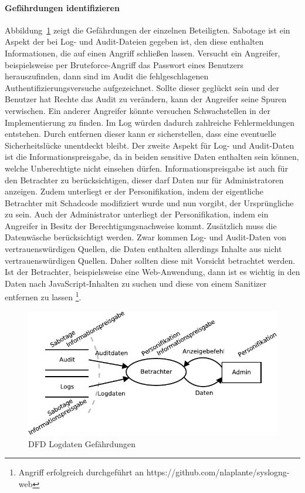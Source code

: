\documentclass[11pt,a4paper]{report}
\begin{document}
\paragraph{Gefährdungen identifizieren}
Abbildung~\ref{fig:dfd_logs_threat} zeigt die Gefährdungen der einzelnen Beteiligten. Sabotage ist ein Aspekt der bei Log- und Audit-Dateien gegeben ist, den diese enthalten Informationen, die auf einen Angriff schließen lassen. Versucht ein Angreifer, beispielsweise per Bruteforce-Angriff das Passwort eines Benutzers herauszufinden, dann sind im Audit die fehlgeschlagenen Authentifizierungsversuche aufgezeichnet. Sollte dieser geglückt sein und der Benutzer hat Rechte das Audit zu verändern, kann der Angreifer seine Spuren verwischen. Ein anderer Angreifer könnte versuchen Schwachstellen in der Implementierung zu finden. Im Log würden dadurch zahlreiche Fehlermeldungen entstehen. Durch entfernen dieser kann er sicherstellen, dass eine eventuelle Sicherheitslücke unentdeckt bleibt. Der zweite Aspekt für Log- und Audit-Daten ist die Informationspreisgabe, da in beiden sensitive Daten enthalten sein können, welche Unberechtigte nicht einsehen dürfen. Informationspreisgabe ist auch für den Betrachter zu berücksichtigen, dieser darf Daten nur für Administratoren anzeigen. Zudem unterliegt er der Personifikation, indem der eigentliche Betrachter mit Schadcode modifiziert wurde und nun vorgibt, der Ursprüngliche zu sein. Auch der Administrator unterliegt der Personifikation, indem ein Angreifer in Besitz der Berechtigungsnachweise kommt. Zusätzlich muss die Datenwäsche berücksichtigt werden. Zwar kommen Log- und Audit-Daten von vertrauenswürdigen Quellen, die Daten enthalten allerdings Inhalte aus nicht vertrauenswürdigen Quellen. Daher sollten diese mit Vorsicht betrachtet werden. Ist der Betrachter, beispielsweise eine Web-Anwendung, dann ist es wichtig in den Daten nach JavaScript-Inhalten zu suchen und diese von einem Sanitizer entfernen zu lassen \footnote{Angriff erfolgreich durchgeführt an https://github.com/nlaplante/syslogng-web}.

\begin{figure}[htbp]
\centering
\includegraphics[scale=1.2]{images/dfd_logs_threats.pdf}
\caption{DFD Logdaten Gefährdungen}
\label{fig:dfd_logs_threat}
\end{figure}
\end{document}
